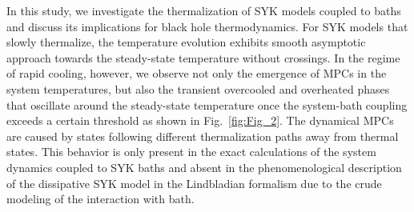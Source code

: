 \documentclass[prl,superscriptaddress,notitlepage,showpacs,twocolumn]{revtex4-2}
\begin{document}
In this study, we investigate the thermalization of SYK models coupled to baths and discuss its implications for black hole thermodynamics. %
For SYK models that slowly thermalize, the temperature evolution exhibits smooth asymptotic approach towards the steady-state temperature without crossings. In the regime of rapid cooling, however, we observe not only the emergence of MPCs in the system temperatures, but also the transient overcooled and overheated phases that oscillate around the steady-state temperature once the system-bath coupling exceeds a certain threshold as shown in Fig.~\ref{fig:Fig_2}. The dynamical MPCs are caused by states following different thermalization paths away from thermal states. This behavior is only present in the exact calculations of the system dynamics coupled to SYK baths and absent in the phenomenological description of the dissipative SYK model in the Lindbladian formalism due to the crude modeling of the interaction with bath. %
\end{document}
